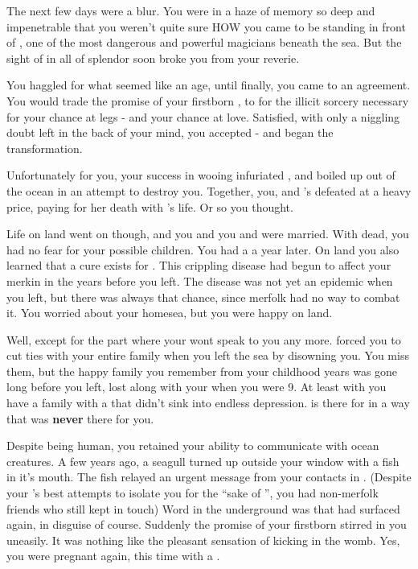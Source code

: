 \documentclass[char]{NeptuneBall}
\begin{document}
The next few days were a blur. You were in a haze of memory so deep and impenetrable that you weren't quite sure HOW you came to be standing in front of \cWitch{}, one of the most dangerous and powerful magicians beneath the sea. But the sight of \cWitch{\them} in all of \cWitch{\their} splendor soon broke you from your reverie.

You haggled for what seemed like an age, until finally, you came to an agreement. You would trade the promise of your firstborn \cArielsSon{\offspring}, to \cWitch{\them} for the illicit sorcery necessary for your chance at legs - and your chance at love. Satisfied, with only a niggling doubt left in the back of your mind, you accepted - and began the transformation.






Unfortunately for you, your success in wooing \cEric{} infuriated \cWitch{}, and \cWitch{\they} boiled up out of the ocean in an attempt to destroy you. Together, you, \cEric{} and \cEric{}'s \cPrince{\sibling} \cSlave{} defeated \cWitch{\them} at a heavy price, paying for her death with \cSlave{}'s life. Or so you thought.

Life on land went on though, and you and you and \cEric{} were married. With \cWitch{} dead, you had no fear for your possible children. You had a \cWillow{\offspring} a year later. On land you also learned that a cure exists for \cPolio{}. This crippling disease had begun to affect your merkin in the years before you left. The disease was not yet an epidemic when you left, but there was always that chance, since merfolk had no way to combat it. You worried about your homesea, but you were happy on land.

Well, except for the part where your \cKing{\parent} wont speak to you any more. \cKing{\They} forced you to cut ties with your entire family when you left the sea by disowning you. You miss them, but the happy family you remember from your childhood years was gone long before you left, lost along with your \cAthena{\parent} when you were 9. At least with \cEric{} you have a family with a \cEric{\parent} that didn't sink into endless depression. \cEric{} is there for \cWillow{} in a way that \cKing{} was {\bf never} there for you.

Despite being human, you retained your ability to communicate with ocean creatures. A few years ago, a seagull turned up outside your window with a fish in it's mouth. The fish relayed an urgent message from your contacts in \pAtlantis{}. (Despite your \cKing{\parent}'s best attempts to isolate you for the ``sake of \pAtlantis{}'', you had non-merfolk friends who still kept in touch) Word in the underground was that \cWitch{} had surfaced again, in disguise of course.  Suddenly the promise of your firstborn \cArielsSon{\offspring} stirred in you uneasily. It was nothing like the pleasant sensation of \cArielsSon{} kicking in the womb. Yes, you were pregnant again, this time with a \cArielsSon{\offspring}.
\end{document}
